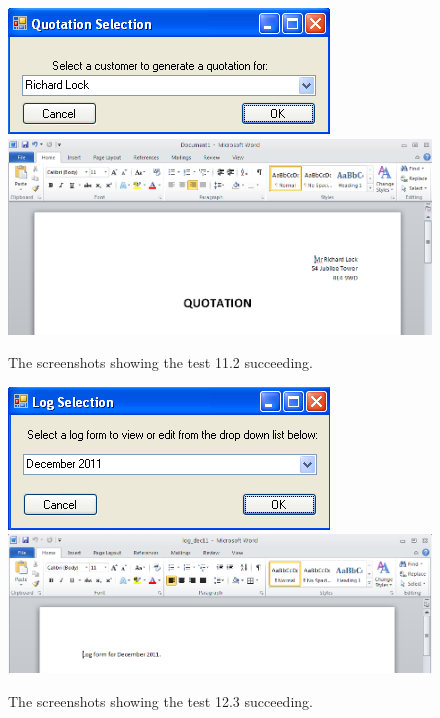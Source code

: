 \begin{figure}[ht]
\centering
\includegraphics[scale=0.5]{test11dot2scrot1}
\includegraphics[scale=0.5]{test11dot2scrot2}
\caption{The screenshots showing the test 11.2 succeeding.}
\label{fig:test_elevendottwo}
\end{figure}

\begin{figure}[ht]
\centering
\includegraphics[scale=0.5]{test12dot3scrot1}
\includegraphics[scale=0.5]{test12dot3scrot2}
\caption{The screenshots showing the test 12.3 succeeding.}
\label{fig:test_twelvedotthree}
\end{figure}